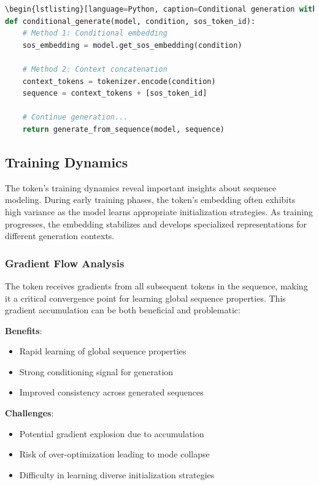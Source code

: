 \begin{lstlisting}[language=Python, caption=Standard \sos{} token implementation]
\begin{lstlisting}[language=Python, caption=Conditional generation with \sos{} token]
def conditional_generate(model, condition, sos_token_id):
    # Method 1: Conditional embedding
    sos_embedding = model.get_sos_embedding(condition)
    
    # Method 2: Context concatenation
    context_tokens = tokenizer.encode(condition)
    sequence = context_tokens + [sos_token_id]
    
    # Continue generation...
    return generate_from_sequence(model, sequence)
\end{lstlisting}

\subsection{Training Dynamics}

The \sos{} token's training dynamics reveal important insights about sequence modeling. During early training phases, the \sos{} token's embedding often exhibits high variance as the model learns appropriate initialization strategies. As training progresses, the embedding stabilizes and develops specialized representations for different generation contexts.

\subsubsection{Gradient Flow Analysis}

The \sos{} token receives gradients from all subsequent tokens in the sequence, making it a critical convergence point for learning global sequence properties. This gradient accumulation can be both beneficial and problematic:

\textbf{Benefits}:
\begin{itemize}
\item Rapid learning of global sequence properties
\item Strong conditioning signal for generation
\item Improved consistency across generated sequences
\end{itemize}

\textbf{Challenges}:
\begin{itemize}
\item Potential gradient explosion due to accumulation
\item Risk of over-optimization leading to mode collapse
\item Difficulty in learning diverse initialization strategies
\end{itemize}

